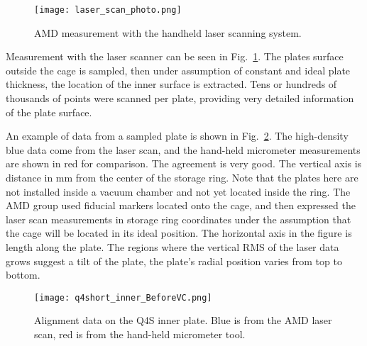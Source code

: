 \begin{figure}[]
	\centering
	\texttt{[image: laser\_scan\_photo.png]}
	\caption{AMD measurement with the handheld laser scanning system.}
	\label{fig:laser_scan_photo}
\end{figure}

Measurement with the laser scanner can be seen in Fig.~\ref{fig:laser_scan_photo}. 
The plates surface outside the cage is sampled, then under assumption of constant and ideal plate thickness, the location of the inner surface is extracted. Tens or hundreds of thousands of points were scanned per plate, providing very detailed information of the plate surface.

An example of data from a sampled plate is shown in Fig.~\ref{fig:Q4Si_BeforeVC}. The high-density blue data come from the laser scan, and the hand-held micrometer measurements are shown in red for comparison. The agreement is very good. 
The vertical axis is distance in mm from the center of the storage ring. Note that the plates here are not installed inside a vacuum chamber and not yet located inside the ring. The AMD group used fiducial markers located onto the cage, and then expressed the laser scan measurements in storage ring coordinates under the assumption that the cage will be located in its ideal position. 
The horizontal axis in the figure is length along the plate.
The regions where the vertical RMS of the laser data grows suggest a tilt of the plate, \ie the plate's radial position varies from top to bottom.

\begin{figure}[]
	\centering
	\texttt{[image: q4short\_inner\_BeforeVC.png]}
	\caption{Alignment data on the Q4S inner plate. Blue is from the AMD laser scan, red is from the hand-held micrometer tool.}\label{fig:Q4Si_BeforeVC}
\end{figure}






